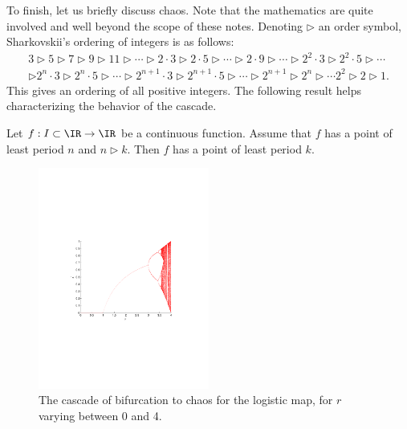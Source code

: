 To finish, let us briefly discuss chaos. Note that the mathematics are quite involved and well beyond the scope of these notes.
Denoting $\triangleright$ an order symbol, Sharkovskii's ordering of integers is as follows:
\begin{gather*}
3\triangleright 5\triangleright 7 \triangleright 9 \triangleright 11\triangleright \cdots \triangleright 2\cdot 3\triangleright  2\cdot 5\triangleright \cdots \triangleright 2\cdot 9\triangleright\cdots\triangleright 2^2\cdot 3\triangleright 2^2\cdot 5\triangleright \cdots \\
\triangleright 2^n\cdot 3\triangleright 2^n\cdot 5\triangleright \cdots\triangleright 2^{n+1}\cdot 3\triangleright 2^{n+1}\cdot 5\triangleright \cdots
\triangleright 2^{n+1}\triangleright 2^n\triangleright \cdots 2^2 \triangleright 2\triangleright 1.
\end{gather*}
This gives an ordering of all positive integers. The following result helps characterizing the behavior of the cascade.
\begin{theorem}[Sharkovskii]\label{th:sharkovskii}
Let $f:I\subset\IR\to\IR$ be a continuous function. Assume that $f$ has a point of least period $n$ and $n\triangleright k$. Then $f$ has a point of least period $k$.
\end{theorem}


\begin{figure}[htbp]
\begin{center}
\includegraphics[width=0.5\textwidth]
{../figs_02_population_growth/analysis_logistic_cascade_full}
\end{center}
\caption{The cascade of bifurcation to chaos for the logistic map, for $r$ varying between 0 and 4.}
\end{figure}

